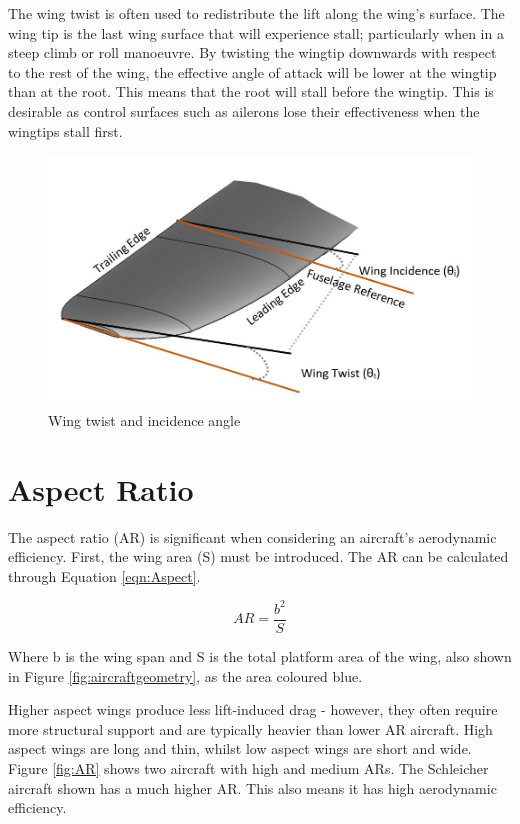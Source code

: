 The wing twist is often used to redistribute the lift along the wing's surface. The wing tip is the last wing surface that will experience stall; particularly when in a steep climb or roll manoeuvre. By twisting the wingtip downwards with respect to the rest of the wing, the effective angle of attack will be lower at the wingtip than at the root. This means that the root will stall before the wingtip. This is desirable as control surfaces such as ailerons lose their effectiveness when the wingtips stall first. 


\begin{figure}[H]
  \centering
  \includegraphics[width=1\linewidth]{02_Background/Figs/wingo.JPG}
  \caption{Wing twist and incidence angle}
  \label{fig:twist}
\end{figure}

\section{Aspect Ratio}
The aspect ratio (AR) is significant when considering an aircraft's aerodynamic efficiency. First, the wing area (S) must be introduced. The AR can be calculated through Equation \ref{eqn:Aspect}.

\begin{equation}
    AR = \frac{b^2}{S}
    \label{eqn:Aspect}
\end{equation}

 Where b is the wing span and S is the total platform area of the wing, also shown in Figure \ref{fig:aircraftgeometry}, as the area coloured blue. 

Higher aspect wings produce less lift-induced drag - however, they often require more structural support and are typically heavier than lower AR aircraft. High aspect wings are long and thin, whilst low aspect wings are short and wide. Figure \ref{fig:AR} shows two aircraft with high and medium ARs. The Schleicher aircraft shown has a much higher AR. This also means it has high aerodynamic efficiency. 



